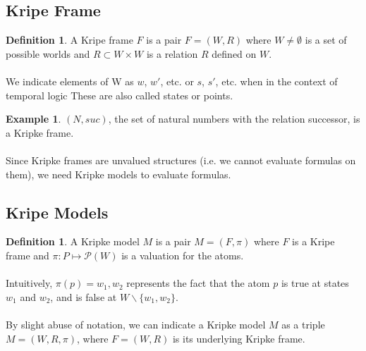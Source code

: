 \documentclass{article}
\theoremstyle{plain}
\theoremstyle{definition}
\newtheorem{defn}[thm]{Definition} %
\newtheorem{exmp}[thm]{Example} %
\begin{document}
\begin{multicols}{2}
\subsection{Kripe Frame}

\begin{defn}A Kripe frame $F$ is a pair $F = (W, R)$ where $W \neq \emptyset$ is a set of possible worlds and $R \subset W \times W$ is a relation $R$ defined on $W$.\end{defn}

\paragraph{} We indicate elements of W as $w$, $w'$, etc. or $s$, $s'$, etc. when in the context of temporal logic These are also called states or points.

\begin{exmp}$(N, suc)$, the set of natural numbers with the relation successor, is a Kripke frame.\end{exmp}

\paragraph{} Since Kripke frames are unvalued structures (i.e. we cannot evaluate formulas on them), we need Kripke models to evaluate formulas.

\subsection{Kripe Models}

\begin{defn}A Kripke model $M$ is a pair $M = (F, \pi)$ where $F$ is a Kripe frame and $\pi: P \mapsto \mathcal{P}(W)$ is a valuation for the atoms. \end{defn}

\paragraph{} Intuitively, $\pi(p)={w_1, w_2}$ represents the fact that the atom $p$ is true at states $w_1$ and $w_2$, and is false at $W \backslash \{w_1, w_2\}$. 

\paragraph{} By slight abuse of notation, we can indicate a Kripke model $M$ as a triple $M = (W, R, \pi)$, where $F = (W, R)$ is its underlying Kripke frame. 


\end{multicols}
\end{document}

